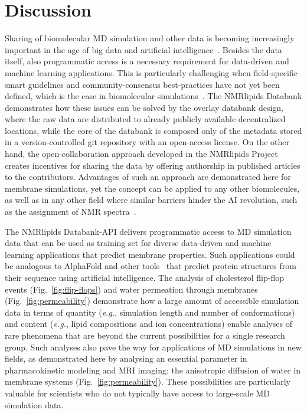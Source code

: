 \documentclass[fleqn,10pt]{wlscirep}
\begin{document}
\section{Discussion}

Sharing of biomolecular MD simulation and other data is becoming increasingly important in the age of big data and artificial intelligence~\cite{sever23,tiemann23}.  Besides the data itself, also programmatic access is a necessary requirement for data-driven and machine learning applications. This is particularly challenging when field-specific smart guidelines and community-consensus best-practices have not yet been defined, which is the case in biomolecular simulations~\cite{tiemann23}. The NMRlipids Databank demonstrates how these issues can be solved by the overlay databank design, where the raw data are distributed to already publicly available decentralized locations, while the core of the databank is composed only of the metadata stored in a version-controlled git repository with an open-access license. On the other hand, the open-collaboration approach developed in the NMRlipids Project~\cite{botan15} creates incentives for sharing the data by offering authorship in published articles to the contributors. Advantages of such an approach are demonstrated here for membrane simulations, yet the concept can be applied to any other biomolecules, as well as in any other field where similar barriers hinder the AI revolution, such as the assignment of NMR spectra~\cite{klukowski22}. 

The NMRlipids Databank-API delivers programmatic access to MD simulation data that can be used as training set for diverse data-driven and machine learning applications that predict membrane properties. Such applications could be analogous to AlphaFold \cite{jumper21} and other tools~\cite{baek21,lin23} that predict protein structures from their sequence using artificial intelligence. The analysis of cholesterol flip-flop events (Fig.~\ref{fig:flip-flops}) and water permeation through membranes (Fig.~\ref{fig:permeability}) demonstrate how a large amount of accessible simulation data in terms of quantity (\textit{e.g.}, simulation length and number of conformations) and content (\textit{e.g.}, lipid compositions and ion concentrations) enable analyses of rare phenomena that are beyond the current possibilities for a single research group. Such analyses also pave the way for applications of MD simulations in new fields, as demonstrated here by analysing an essential parameter in pharmacokinetic modeling and MRI imaging:\cite{nitsche19,topgaard20} the anisotropic diffusion of water in membrane systems (Fig.~\ref{fig:permeability}). These possibilities are particularly valuable for scientists who do not typically have access to large-scale MD simulation data. 
\end{document}
